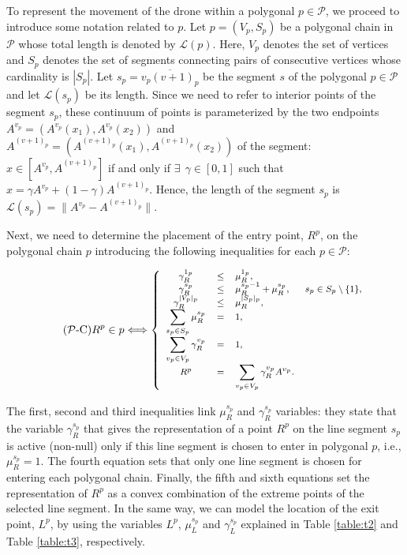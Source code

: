 \documentclass{itor}
\theoremstyle{definition}
\theoremstyle{remark}
\begin{document}
To represent the movement of the drone within a polygonal $p\in\mathcal P$, we proceed to introduce some notation related to $p$.
Let $p = (V_p, S_p)$ be a polygonal chain in $\mathcal P$ whose total length is denoted by $\mathcal L(p)$. Here, $V_p$ denotes the set of vertices and $S_p$ denotes the set of segments connecting pairs of consecutive vertices whose cardinality is $|S_p|$. Let $s_p=\overline{v_p(v+1)_p}$ be the segment $s$ of the polygonal $p \in \mathcal P$ and let $\mathcal  L(s_p)$ be its length. Since we need to refer to interior points of the segment $s_p$, these continuum of points is parameterized by the two endpoints $A^{v_p}= (A^{v_p}(x_1), A^{v_p}(x_2))$ and $A^{(v+1)_p}= (A^{(v+1)_p}(x_1), A^{(v+1)_p}(x_2))$ of the segment: $x\in[A^{v_p}, A^{(v+1)_p}]$ if and only if $\exists \:\: \gamma\in[0, 1]$ such that $x=\gamma A^{v_p} + (1-\gamma)A^{(v+1)_p}$. Hence, the length of the segment $s_p$ is $\mathcal L(s_p) =\|A^{v_p} -  A^{(v+1)_p}\|$.

Next, we need to determine the placement of the entry point, $R^p$, on the polygonal chain $p$ introducing the following inequalities for each $p\in\mathcal P$:

\begin{equation}\label{P-C}\tag{$\mathcal P$-C}
\small
 R^p\in p \Longleftrightarrow
 \left\{
 \begin{array}{cclr}
 \gamma_R^{1_p}                     & \leq & \mu_R^{1_p},                                  & \\
 \gamma_R^{s_p}                     & \leq & \mu_R^{s_p-1} + \mu_R^{s_p}, & s_p\in S_p \setminus\{1\},\\
 \gamma_R^{|V_p|_p}             & \leq & \mu_R^{|S_p|_p}, \\
 \displaystyle\sum_{s_p\in S_p} \mu_R^{s_p}      &   =  & 1, & \\
 \displaystyle\sum_{v_p\in V_p} \gamma_R^{v_p}   &   =  & 1, & \\
  R^p                               & = & \displaystyle\sum_{v_p\in V_p}\gamma_R^{v_p}A^{v_p}. & \\
 \end{array}
 \right.
\end{equation}

The first, second and third inequalities link $\mu_R^{s_p}$ and $\gamma_R^{s_p}$ variables: they state that the variable $\gamma_R^{s_p}$ that gives the representation of a point $R^p$ on the line segment $s_p$ is active (non-null) only if this line segment is chosen to enter in polygonal $p$, i.e., $\mu_R^{s_p}=1$. The fourth equation sets that only one line segment is chosen for entering each polygonal chain. Finally, the fifth and sixth equations set the representation of $R^p$ as a convex combination of the extreme points of the selected line segment.
In the same way, we can model the location of the exit point, $L^p$, by using the variables $L^p$, $\mu_L^{s_p}$ and $\gamma_L^{s_p}$ explained in Table \ref{table:t2} and Table \ref{table:t3}, respectively.
\end{document}
